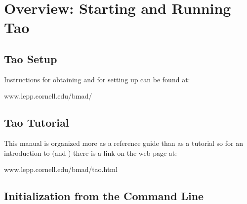 \chapter{Overview: Starting and Running Tao}
\label{c:overview.tao}

\section{Tao Setup}
\label{s:obtaining}

Instructions for obtaining and for setting up \tao can be found at:
\begin{example}
  www.lepp.cornell.edu/bmad/
\end{example}

\section{Tao Tutorial}
\label{s:tutorial}

This manual is organized more as a reference guide than as a tutorial so for an introduction
to \tao (and \bmad) there is a link on the web page at:
\begin{example}
  www.lepp.cornell.edu/bmad/tao.html
\end{example}

\section{Initialization from the Command Line}
\label{s:command.line} 

